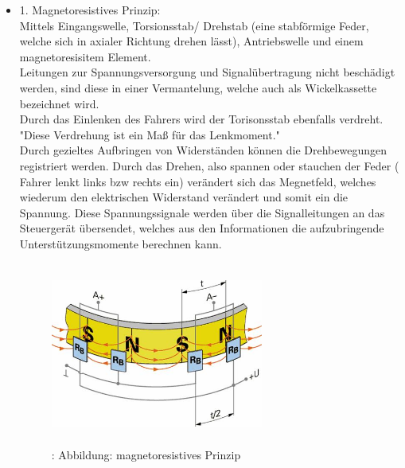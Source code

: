 				\begin{itemize}
					\item 1. Magnetoresistives Prinzip:\\
							 Mittels Eingangswelle, Torsionsstab/ Drehstab (eine stabförmige Feder, welche sich in axialer Richtung drehen lässt), Antriebswelle und einem magnetoresisitem Element. \\
							 Leitungen zur Spannungsversorgung und Signalübertragung nicht beschädigt werden, sind diese in einer Vermantelung, welche auch als Wickelkassette bezeichnet wird.\\
							 
							 Durch das Einlenken des Fahrers wird der Torisonsstab ebenfalls verdreht. "Diese Verdrehung ist ein Maß für das Lenkmoment."\cite{TS12}\\
							 Durch gezieltes Aufbringen von Widerständen können die Drehbewegungen registriert werden. Durch das Drehen, also spannen oder stauchen der Feder ( Fahrer lenkt links bzw rechts ein) verändert sich das Megnetfeld, welches wiederum den elektrischen Widerstand verändert und somit ein die Spannung. Diese Spannungssignale werden über die Signalleitungen an das Steuergerät übersendet, welches aus den Informationen die aufzubringende Unterstützungsmomente berechnen kann.
										 
							\begin{figure}
								\centering
								\includegraphics[width=7cm, height=6cm] {lenkdrehmomentsensor.png}
								\caption {\cite{TS13}: Abbildung: magnetoresistives Prinzip}
							\end{figure}			 
								

\end{itemize}
